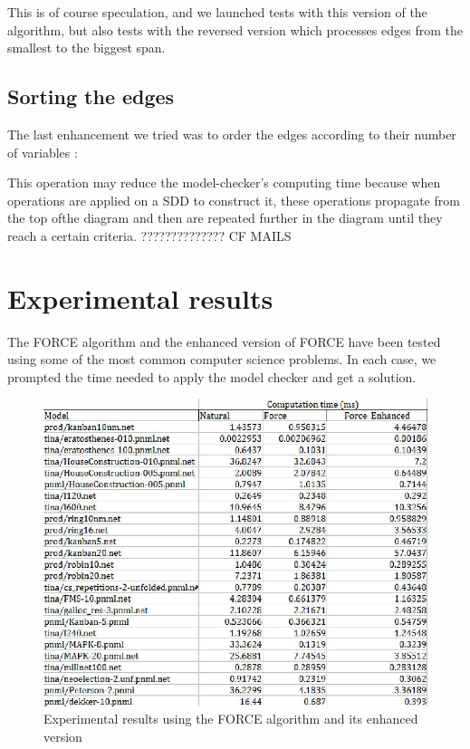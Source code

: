 \documentclass[12pt]{report}
\begin{document}
This is of course speculation, and we launched tests with this version of the algorithm, but also tests with the reversed version which processes edges from the smallest to the biggest span.

\section{Sorting the edges}

The last enhancement we tried was to order the edges according to their number of variables :

\begin{algorithm}
\begin{algorithmic}[1]
\EndFunction
\end{algorithmic}
\end{algorithm}

This operation may reduce the model-checker's computing time because when operations are applied on a SDD to construct it, these operations propagate from the top ofthe diagram and then are repeated further in the diagram until they reach a certain criteria. ?????????????? CF MAILS

\chapter{Experimental results}

The FORCE algorithm and the enhanced version of FORCE have been tested using some of the most common computer science problems. In each case, we prompted the time needed to apply the model checker and get a solution.

\begin{figure}[!h]
  \includegraphics[scale=0.35]{images/force_results.jpg}
  \caption{Experimental results using the FORCE algorithm and its enhanced version}
  \label{force_results}
\end{figure}
\end{document}
